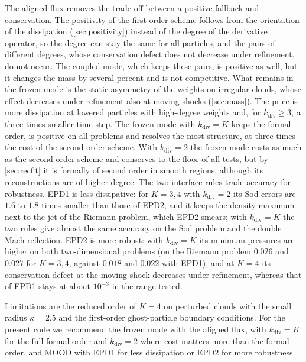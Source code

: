 \documentclass[smallextended]{svjour3}
\numberwithin{equation}{section}
\begin{document}
The aligned flux removes the trade-off between a positive fallback and conservation. The positivity of the first-order scheme follows from the orientation of the dissipation (\cref{sec:positivity}) instead of the degree of the derivative operator, so the degree can stay the same for all particles, and the pairs of different degrees, whose conservation defect does not decrease under refinement, do not occur. The coupled mode, which keeps these pairs, is positive as well, but it changes the mass by several percent and is not competitive. What remains in the frozen mode is the static asymmetry of the weights on irregular clouds, whose effect decreases under refinement also at moving shocks (\cref{sec:mass}). The price is more dissipation at lowered particles with high-degree weights and, for $k_{\mathrm{div}}\ge3$, a three times smaller time step. The frozen mode with $k_{\mathrm{div}}=K$ keeps the formal order, is positive on all problems and resolves the most structure, at three times the cost of the second-order scheme. With $k_{\mathrm{div}}=2$ the frozen mode costs as much as the second-order scheme and conserves to the floor of all tests, but by \cref{sec:recfit} it is formally of second order in smooth regions, although its reconstructions are of higher degree. The two interface rules trade accuracy for robustness. EPD1 is less dissipative: for $K=3,4$ with $k_{\mathrm{div}}=2$ its Sod errors are $1.6$ to $1.8$ times smaller than those of EPD2, and it keeps the density maximum next to the jet of the Riemann problem, which EPD2 smears; with $k_{\mathrm{div}}=K$ the two rules give almost the same accuracy on the Sod problem and the double Mach reflection. EPD2 is more robust: with $k_{\mathrm{div}}=K$ its minimum pressures are higher on both two-dimensional problems (on the Riemann problem $0.026$ and $0.027$ for $K=3,4$, against $0.018$ and $0.022$ with EPD1), and at $K=4$ its conservation defect at the moving shock decreases under refinement, whereas that of EPD1 stays at about $10^{-3}$ in the range tested.

Limitations are the reduced order of $K=4$ on perturbed clouds with the small radius $\kappa=2.5$ and the first-order ghost-particle boundary conditions. For the present code we recommend the frozen mode with the aligned flux, with $k_{\mathrm{div}}=K$ for the full formal order and $k_{\mathrm{div}}=2$ where cost matters more than the formal order, and MOOD with EPD1 for less dissipation or EPD2 for more robustness.

\end{document}

